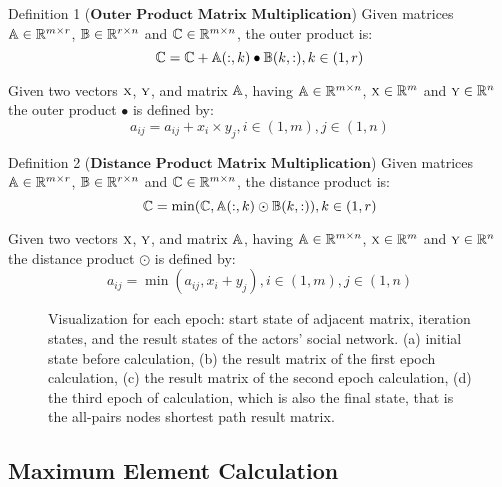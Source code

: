 \documentclass[review]{cvpr}
\begin{document}
Definition 1 ($\textbf{Outer Product Matrix Multiplication}$) Given matrices \(\Bbb A \in \Bbb R^{m\times r}\), \(\Bbb B \in \Bbb R^{r\times n}\) and \(\Bbb C \in \Bbb R^{m\times n}\), the outer product is:
\begin{equation}
\Bbb C = \Bbb C  + \Bbb A(:,k)\bullet \Bbb B(k,:) , k \in (1,r)
\end{equation}

Given two vectors \(\textsc x\), \(\textsc y\), and matrix \(\Bbb A\), having \(\Bbb A \in \Bbb R^{m\times n}\), \(\textsc x \in \Bbb R^{m}\) and \(\textsc y \in \Bbb R^{n}\) the outer product \(\bullet\) is defined by:
\begin{equation}
a_{ij} = a_{ij} + x_i \times  y_j, i \in (1,m), j \in (1,n)
\end{equation}

Definition 2 ($\textbf{Distance Product Matrix Multiplication}$) Given matrices \(\Bbb A \in \Bbb R^{m\times r}\), \(\Bbb B \in \Bbb R^{r\times n}\) and \(\Bbb C \in \Bbb R^{m\times n}\), the distance product is:
\begin{equation}
  \Bbb C = \min(\Bbb C, \Bbb A(:,k)\odot \Bbb B(k,:)) , k \in (1,r)
\end{equation}

Given two vectors \(\textsc x\), \(\textsc y\), and matrix \(\Bbb A\), having \(\Bbb A \in \Bbb R^{m\times n}\), \(\textsc x \in \Bbb R^{m}\) and \(\textsc y \in \Bbb R^{n}\) the distance product \(\odot\) is defined by:
\begin{equation}
a_{ij} = \min(a_{ij} , x_i + y_j), i \in (1,m), j \in (1,n)
\end{equation}
\begin{figure*}
\begin{center}
\end{center}
   \caption{Visualization for each epoch: start state of adjacent matrix, iteration states, and the result states of the actors' social network.
   (a) initial state before calculation,
   (b) the result matrix of the first epoch calculation,
   (c) the result matrix of the second epoch calculation,
   (d) the third epoch of calculation, which is also the final state, that is the all-pairs nodes shortest path result matrix.}
\label{fig:short}
\end{figure*}


\subsection{Maximum Element Calculation}
\end{document}
